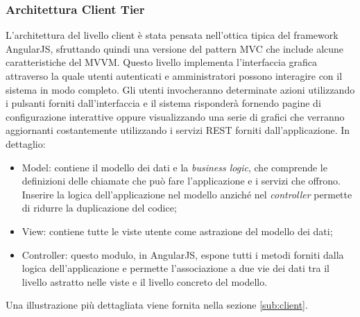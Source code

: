 		\subsubsection{Architettura Client Tier}
		L'architettura del livello client è stata pensata nell'ottica tipica del framework AngularJS, sfruttando quindi una versione del pattern MVC che include alcune caratteristiche del MVVM. Questo livello implementa l'interfaccia grafica attraverso la quale utenti autenticati e amministratori possono interagire con il sistema in modo completo.
		\newline
		Gli utenti invocheranno determinate azioni utilizzando i pulsanti forniti dall'interfaccia e il sistema risponderà fornendo pagine di configurazione interattive oppure visualizzando una serie di grafici che verranno aggiornanti costantemente utilizzando i servizi REST forniti dall'applicazione. In dettaglio:
		\begin{itemize}
			\item Model: contiene il modello dei dati e la \textit{business logic}, che comprende le definizioni delle chiamate che può fare l'applicazione e i servizi che offrono. Inserire la logica dell'applicazione nel modello anziché nel \textit{controller} permette di ridurre la duplicazione del codice;
			\item View: contiene tutte le viste utente come astrazione del modello dei dati;
			\item Controller: questo modulo, in AngularJS, espone tutti i metodi forniti dalla logica dell'applicazione e permette l'associazione a due vie dei dati tra il livello astratto nelle viste e il livello concreto del modello.
		\end{itemize}
		\noindent
		Una illustrazione più dettagliata viene fornita nella sezione \ref{sub:client}.

